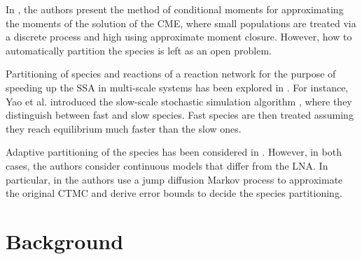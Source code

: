 \documentclass{llncs}
\begin{document}
In \cite{hasenauer2014method}, the authors present the method of conditional moments %
for approximating the moments of the solution of the CME, 
where small populations are treated via a discrete process and high using approximate moment closure.
However, %
 how to automatically partition the species is left as an open problem. %


Partitioning of species and reactions of a reaction network for the purpose of speeding up the SSA in multi-scale systems has been explored in \cite{goutsias2005quasiequilibrium,salis2005accurate,rao2003stochastic}.
For instance, Yao et al. introduced the slow-scale stochastic simulation algorithm \cite{cao2005slow}, where they distinguish between fast and slow species. Fast species are then treated assuming they reach equilibrium much faster than the slow ones. { Adaptive partitioning of the species has been considered in \cite{hepp2015adaptive,ganguly2015jump}. However, in both cases, the authors consider continuous models that differ from the LNA. In particular, in \cite{ganguly2015jump} the authors use a jump diffusion Markov process to approximate the original CTMC and derive error bounds to decide the species partitioning.

}

\section{Background}
\end{document}
